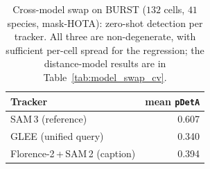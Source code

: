 \begin{table}[htbp]\centering
  \caption[Cross-model swap scores]{Cross-model swap on BURST ($132$ cells, $41$ species, mask-HOTA): zero-shot detection per
  tracker. All three are non-degenerate, with sufficient per-cell spread for the regression; the
  distance-model results are in Table~\ref{tab:model_swap_cv}.}
  \label{tab:model_swap}
  \begin{tabular}{lr}
    \toprule
    Tracker & mean \texttt{pDetA} \\
    \midrule
    SAM\,3 (reference)              & 0.607 \\
    GLEE (unified query)            & 0.340 \\
    Florence-2\,+\,SAM\,2 (caption) & 0.394 \\
    \bottomrule
  \end{tabular}
\end{table}
